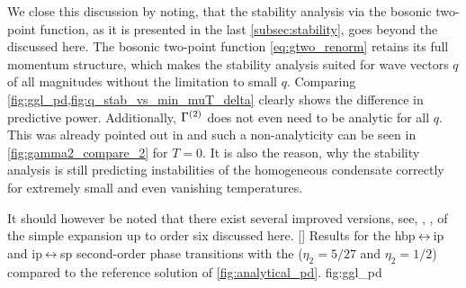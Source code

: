 We close this discussion by noting, that the stability analysis via the bosonic two-point function, as it is presented in the last \cref{subsec:stability}, goes beyond the \ggle{} discussed here.
The bosonic two-point function \cref{eq:gtwo_renorm} retains its full momentum structure, which makes the stability analysis suited for wave vectors $q$ of all magnitudes without the limitation to small $q$.
Comparing \cref{fig:ggl_pd,fig:q_stab_vs_min_muT_delta} clearly shows the difference in predictive power.
Additionally, $\Gamma^{(2)}$ does not even need to be analytic for all $q$.
This was already pointed out in  and such a non-analyticity can be seen in \cref{fig:gamma2_compare_2} for $T=0$.
It is also the reason, why the stability analysis is still predicting instabilities of the homogeneous condensate correctly for extremely small and even vanishing temperatures.

It should however be noted that there exist several improved versions, see, \eg{}, , of the simple expansion up to order six discussed here.\clearpage
{}%
	[]%
	{%
		Results for the \gls{hbp}$\,\leftrightarrow\,$\gls{ip} and \gls{ip}$\,\leftrightarrow\,$\gls{sp} second-order phase transitions with the \ggla{} ($\eta_2=5/27$ and $\eta_2=1/2$) compared to the reference solution of \cref{fig:analytical_pd}.
	}%
	{fig:ggl_pd}%